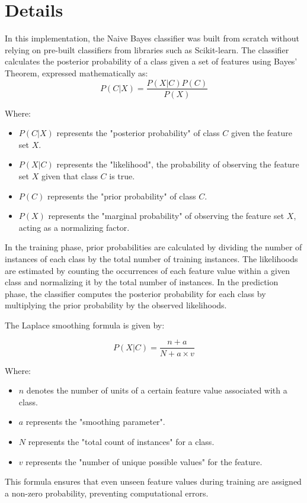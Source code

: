 \section{Details}
In this implementation, the Naive Bayes classifier was built from scratch without relying on pre-built classifiers from libraries such as Scikit-learn. The classifier calculates the posterior probability of a class given a set of features using Bayes' Theorem, expressed mathematically as:
\[
P(C|X) = \frac{P(X|C)P(C)}{P(X)}
\]

Where:
\begin{itemize}
    \item \(P(C|X)\) represents the "posterior probability" of class \(C\) given the feature set \(X\).
    \item \(P(X|C)\) represents the "likelihood", the probability of observing the feature set \(X\) given that class \(C\) is true.
    \item \(P(C)\) represents the "prior probability" of class \(C\).
    \item \(P(X)\) represents the "marginal probability" of observing the feature set \(X\), acting as a normalizing factor.
\end{itemize}

In the training phase, prior probabilities are calculated by dividing the number of instances of each class by the total number of training instances. The likelihoods are estimated by counting the occurrences of each feature value within a given class and normalizing it by the total number of instances. In the prediction phase, the classifier computes the posterior probability for each class by multiplying the prior probability by the observed likelihoods.

The Laplace smoothing formula is given by:

\[
P(X|C) = \frac{n + a}{N + a \times v}
\]

Where:
\begin{itemize}
    \item \(n\) denotes the number of units of a certain feature value associated with a class.
    \item \(a\) represents the "smoothing parameter".
    \item \(N\) represents the "total count of instances" for a class.
    \item \(v\) represents the "number of unique possible values" for the feature.
\end{itemize}

This formula ensures that even unseen feature values during training are assigned a non-zero probability, preventing computational errors.

